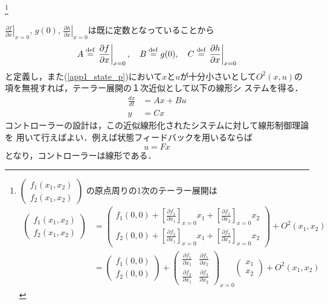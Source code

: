 \footnote{
$
  \left(\begin{array}{c}
	f_1(x_1,x_2) \\
	f_2(x_1,x_2) 
  \end{array}\right)
$
の原点周りの1次のテーラー展開は
\begin{align*}
  \left(\begin{array}{c}
	f_1(x_1,x_2) \\
	f_2(x_1,x_2) 
  \end{array}\right)
  &=
  \left(\begin{array}{c}
	f_1(0,0) +
	\left[ \frac{\partial f_1}{\partial x_1} \right]_{x=0} x_1 
	   + \left[ \frac{\partial f_1}{\partial x_2} \right]_{x=0} x_2 \\
	f_2(0,0) +
	\left[ \frac{\partial f_2}{\partial x_1}\right]_{x=0} x_1 
		+ \left[ \frac{\partial f_2}{\partial x_2}\right]_{x=0} x_2
  \end{array}\right)
  + O^2(x_1,x_2)
  \nonumber \\
  &=
  \left(\begin{array}{c}
	f_1(0,0) \\
	f_2(0,0) 
  \end{array}\right)
  +
  \left(\begin{array}{cc}
	\frac{\partial f_1}{\partial x_1}
		& \frac{\partial f_1}{\partial x_2} \\
	\frac{\partial f_2}{\partial x_1}
		& \frac{\partial f_2}{\partial x_2}
  \end{array}\right)_{x=0}
  \left(\begin{array}{c}
	x_1 \\
	x_2 
  \end{array}\right)
  + O^2(x_1,x_2)
\end{align*}
}

$\left. \frac{\partial f}{\partial x} \right \vert _{x=0}$, $
g(0)$, $\left. \frac{\partial h}{\partial x} \right \vert _{x=0}$は既に定数となっていることから
\begin{equation}
 A \stackrel{\rm def}{=} \left.\frac{\partial f}{\partial x} \right \vert _{x=0},
  \quad	B \stackrel{\rm def}{=} g(0),
  \quad	C \stackrel{\rm def}{=} \left. \frac{\partial h}{\partial x} \right \vert _{x=0}
\end{equation}
と定義し，また(\ref{app1_state_p})において$x$と$u$が十分小さいとして$
O^2(x, u)$の項を無視すれば，テーラー展開の１次近似として以下の線形シ
ステムを得る．
\begin{align}
 \frac{dx}{dt} &= A x + B u
  \label{first_approx}
\\
 y&= C x
\end{align}
コントローラーの設計は，この近似線形化されたシステムに対して線形制御理論を
用いて行えばよい．例えば状態フィードバックを用いるならば
\begin{equation}
 u = Fx
\end{equation}
となり，コントローラーは線形である．

